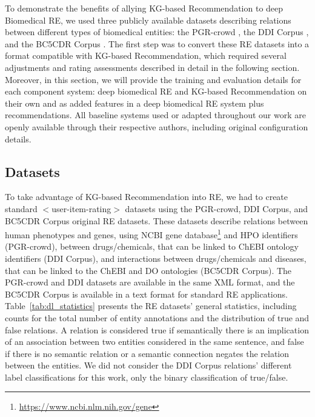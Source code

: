 To demonstrate the benefits of allying KG-based Recommendation to deep Biomedical RE, we used three publicly available datasets describing relations between different types of biomedical entities: the PGR-crowd \citep{sousa2020hybrid,sousa2019silver}, the DDI Corpus \citep{herrero2013ddi}, and the BC5CDR Corpus \citep{li2016biocreative}. The first step was to convert these RE datasets into a format compatible with KG-based Recommendation, which required several adjustments and rating assessments described in detail in the following section. Moreover, in this section, we will provide the training and evaluation details for each component system: deep biomedical RE and KG-based Recommendation on their own and as added features in a deep biomedical RE system plus recommendations. All baseline systems used or adapted throughout our work are openly available through their respective authors, including original configuration details.   

\subsection{Datasets}

To take advantage of KG-based Recommendation into RE, we had to create standard $<$user-item-rating$>$ datasets using the PGR-crowd, DDI Corpus, and BC5CDR Corpus original RE datasets. These datasets describe relations between human phenotypes and genes, using NCBI gene database\footnote{\url{https://www.ncbi.nlm.nih.gov/gene}} and HPO identifiers (PGR-crowd), between drugs/chemicals, that can be linked to ChEBI ontology identifiers (DDI Corpus), and interactions between drugs/chemicals and diseases, that can be linked to the ChEBI and DO ontologies (BC5CDR Corpus). The PGR-crowd and DDI datasets are available in the same XML format, and the BC5CDR Corpus is available in a text format for standard RE applications. Table~\ref{tab:dl_statistics} presents the RE datasets' general statistics, including counts for the total number of entity annotations and the distribution of true and false relations. A relation is considered true if semantically there is an implication of an association between two entities considered in the same sentence, and false if there is no semantic relation or a semantic connection negates the relation between the entities. We did not consider the DDI Corpus relations' different label classifications for this work, only the binary classification of true/false. 

